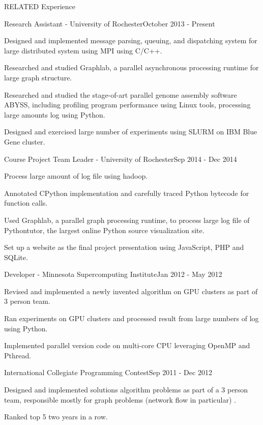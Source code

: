 \documentclass{resume} %
\begin{document}
\begin{rSection}{RELATED Experience}

\begin{rSubsection}{Research Assistant - University of Rochester}{October 2013 - Present}{}{}
\item Designed and implemented message parsing, queuing, and dispatching system for large distributed system using MPI using C/C++.
\item Researched and studied Graphlab, a parallel asynchronous processing runtime for large graph structure. 
\item Researched and studied the stage-of-art parallel genome assembly software ABYSS, including profiling program performance using Linux tools, processing large amounts log using Python. 
\item Designed and exercised large number of experiments using SLURM on IBM Blue Gene cluster. 
\end{rSubsection}

\begin{rSubsection}{Course Project Team Leader - University of Rochester}{Sep 2014 - Dec 2014}{}{}
\item Process large amount of log file using hadoop. 
\item Annotated CPython implementation and carefully traced Python bytecode for function calls. 
\item Used Graphlab, a parallel graph processing runtime, to process large log file of Pythontutor, the largest online Python source visualization site.
\item Set up a website as the final project presentation using JavaScript, PHP and SQLite. 
\end{rSubsection}


\begin{rSubsection}{Developer - Minnesota Supercomputing Institute}{Jan 2012 - May 2012}{}{}
\item Revised and implemented a newly invented algorithm on GPU clusters as part of 3 person team.
\item Ran experiments on GPU clusters and processed result from large numbers of log using Python.
\item Implemented parallel version code on multi-core CPU leveraging OpenMP and Pthread.
\end{rSubsection}


\begin{rSubsection}{International Collegiate Programming Contest}{Sep 2011 - Dec 2012}{}{}
\item Designed and implemented solutions algorithm problems as part of a 3 person team, responsible mostly for graph problems (network flow in particular) .
\item Ranked top 5 two years in a row. 
\end{rSubsection}

\end{rSection}
\end{document}
